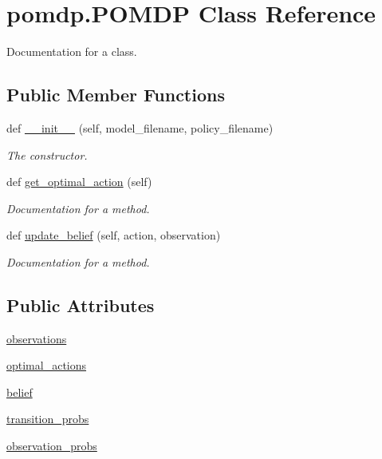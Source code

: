 \hypertarget{classpomdp_1_1POMDP}{}\section{pomdp.\+P\+O\+M\+DP Class Reference}
\label{classpomdp_1_1POMDP}


Documentation for a class.  


\subsection*{Public Member Functions}
\begin{DoxyCompactItemize}
\item 
def \hyperlink{classpomdp_1_1POMDP_ac2ca0e5dba34bdfae5f27ec37d653246}{\+\_\+\+\_\+init\+\_\+\+\_\+} (self, model\+\_\+filename, policy\+\_\+filename)
\begin{DoxyCompactList}\small\item\em The constructor. \end{DoxyCompactList}\item 
def \hyperlink{classpomdp_1_1POMDP_a0c430ce50296aff651601fad666c695d}{get\+\_\+optimal\+\_\+action} (self)
\begin{DoxyCompactList}\small\item\em Documentation for a method. \end{DoxyCompactList}\item 
def \hyperlink{classpomdp_1_1POMDP_ab2fefd985014e5bba21c798f9fe22218}{update\+\_\+belief} (self, action, observation)
\begin{DoxyCompactList}\small\item\em Documentation for a method. \end{DoxyCompactList}\end{DoxyCompactItemize}
\subsection*{Public Attributes}
\begin{DoxyCompactItemize}
\item 
\hyperlink{classpomdp_1_1POMDP_ab936d6506f8610ccb8be4b58de8ec0e5}{observations}
\item 
\hyperlink{classpomdp_1_1POMDP_a4ddaceb23f7c3e37afc0da249475117d}{optimal\+\_\+actions}
\item 
\hyperlink{classpomdp_1_1POMDP_a46a42a6a078ee5c116004a48bd36293b}{belief}
\item 
\hyperlink{classpomdp_1_1POMDP_a3561b1af2cc307f204a67b99580faff7}{transition\+\_\+probs}
\item 
\hyperlink{classpomdp_1_1POMDP_a768131a4afac0d4d24404d12fa5f62fe}{observation\+\_\+probs}
\end{DoxyCompactItemize}


